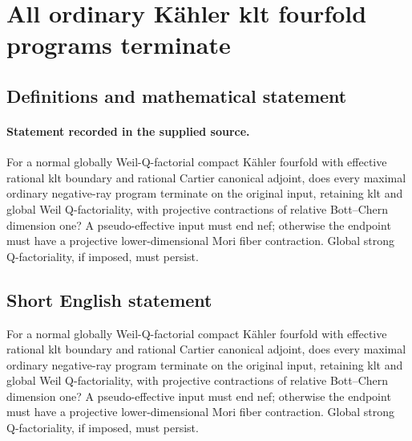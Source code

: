 \documentclass[11pt]{article}
\begin{document}
\section*{All ordinary Kähler klt fourfold programs terminate}\label{30007009}
\subsection{Definitions and mathematical statement}
\paragraph{Statement recorded in the supplied source.}
For a normal globally Weil-Q-factorial compact Kähler fourfold with effective rational klt boundary and rational Cartier canonical adjoint, does every maximal ordinary negative-ray program terminate on the original input, retaining klt and global Weil Q-factoriality, with projective contractions of relative Bott–Chern dimension one? A pseudo-effective input must end nef; otherwise the endpoint must have a projective lower-dimensional Mori fiber contraction. Global strong Q-factoriality, if imposed, must persist.
\subsection{Short English statement}
For a normal globally Weil-Q-factorial compact Kähler fourfold with effective rational klt boundary and rational Cartier canonical adjoint, does every maximal ordinary negative-ray program terminate on the original input, retaining klt and global Weil Q-factoriality, with projective contractions of relative Bott–Chern dimension one? A pseudo-effective input must end nef; otherwise the endpoint must have a projective lower-dimensional Mori fiber contraction. Global strong Q-factoriality, if imposed, must persist.
\end{document}
